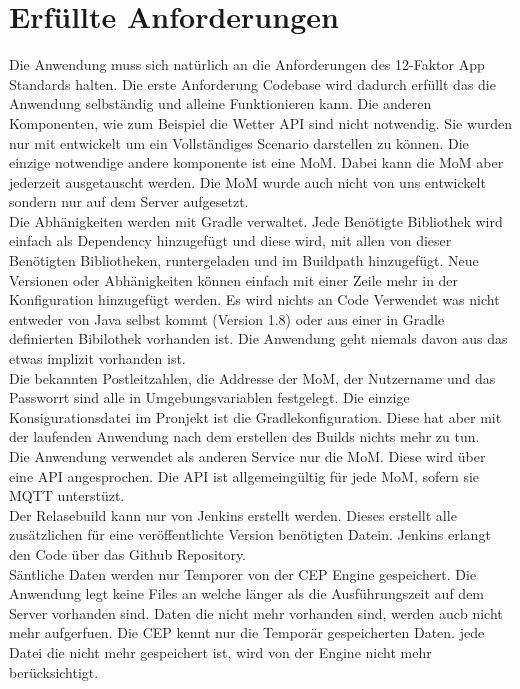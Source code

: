 \section{Erfüllte Anforderungen}
Die Anwendung muss sich natürlich an die Anforderungen des 12-Faktor App Standards halten. Die erste Anforderung Codebase wird dadurch erfüllt das die Anwendung selbständig und alleine Funktionieren kann. Die anderen Komponenten, wie zum Beispiel die Wetter API sind nicht notwendig. Sie wurden nur mit entwickelt um ein Vollständiges Scenario darstellen zu können. Die einzige notwendige andere komponente ist eine MoM. Dabei kann die MoM aber jederzeit ausgetauscht werden. Die MoM wurde auch nicht von uns entwickelt sondern nur auf dem Server aufgesetzt. 
\\
Die Abhänigkeiten werden mit Gradle verwaltet. Jede Benötigte Bibliothek wird einfach als Dependency hinzugefügt und diese wird, mit allen von dieser Benötigten Bibliotheken, runtergeladen und im Buildpath hinzugefügt. Neue Versionen oder Abhänigkeiten können einfach mit einer Zeile mehr in der Konfiguration hinzugefügt werden. Es wird nichts an Code Verwendet was nicht entweder von Java selbst kommt (Version 1.8) oder aus einer in Gradle definierten Bibilothek vorhanden ist. Die Anwendung geht niemals davon aus das etwas implizit vorhanden ist.
\\
Die bekannten Postleitzahlen, die Addresse der MoM, der Nutzername und das Passworrt sind alle in Umgebungsvariablen festgelegt. Die einzige Konsigurationsdatei im Pronjekt ist die Gradlekonfiguration. Diese hat aber mit der laufenden Anwendung nach dem erstellen des Builds nichts mehr zu tun. 
\\
Die Anwendung verwendet als anderen Service nur die MoM. Diese wird über eine API angesprochen. Die API ist allgemeingültig für jede MoM, sofern sie MQTT unterstüzt. 
\\
Der Relasebuild kann nur von Jenkins erstellt werden. Dieses erstellt alle zusätzlichen für eine veröffentlichte Version benötigten Datein. Jenkins erlangt den Code über das Github Repository. 
\\
Säntliche Daten werden nur Temporer von der CEP Engine gespeichert. Die Anwendung legt keine Files an welche länger als die Ausführungszeit auf dem Server vorhanden sind. Daten die nicht mehr vorhanden sind, werden aucb nicht mehr aufgerfuen. Die CEP kennt nur die Temporär gespeicherten Daten. jede Datei die nicht mehr gespeichert ist, wird von der Engine nicht mehr berücksichtigt. 
\\
